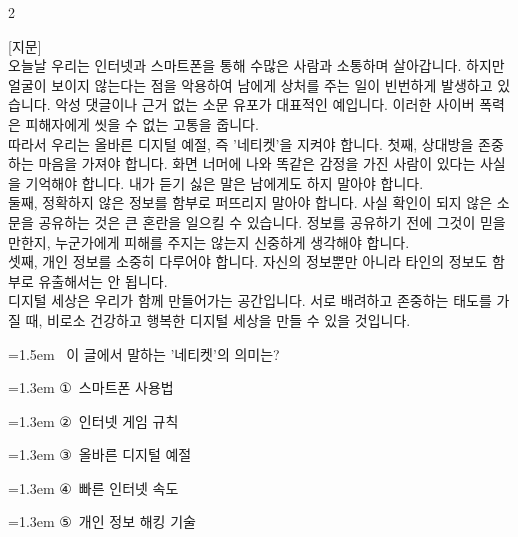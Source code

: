 \documentclass[11pt, a4paper]{article}
\begin{document}
\begin{multicols}{2}
\begin{passagebox}
\noindent{}[지문] \\
오늘날 우리는 인터넷과 스마트폰을 통해 수많은 사람과 소통하며 살아갑니다. 하지만 얼굴이 보이지 않는다는 점을 악용하여 남에게 상처를 주는 일이 빈번하게 발생하고 있습니다. 악성 댓글이나 근거 없는 소문 유포가 대표적인 예입니다. 이러한 사이버 폭력은 피해자에게 씻을 수 없는 고통을 줍니다. \\
따라서 우리는 올바른 디지털 예절, 즉 '네티켓'을 지켜야 합니다. 첫째, 상대방을 존중하는 마음을 가져야 합니다. 화면 너머에 나와 똑같은 감정을 가진 사람이 있다는 사실을 기억해야 합니다. 내가 듣기 싫은 말은 남에게도 하지 말아야 합니다. \\
둘째, 정확하지 않은 정보를 함부로 퍼뜨리지 말아야 합니다. 사실 확인이 되지 않은 소문을 공유하는 것은 큰 혼란을 일으킬 수 있습니다. 정보를 공유하기 전에 그것이 믿을 만한지, 누군가에게 피해를 주지는 않는지 신중하게 생각해야 합니다. \\
셋째, 개인 정보를 소중히 다루어야 합니다. 자신의 정보뿐만 아니라 타인의 정보도 함부로 유출해서는 안 됩니다. \\
디지털 세상은 우리가 함께 만들어가는 공간입니다. 서로 배려하고 존중하는 태도를 가질 때, 비로소 건강하고 행복한 디지털 세상을 만들 수 있을 것입니다.
\end{passagebox}
\vspace{1mm}

\noindent\begin{minipage}{\columnwidth}
\vspace{2mm}
{\hangindent=1.5em  ~이 글에서 말하는 '네티켓'의 의미는?\par}

\vspace{0.5mm}
{\hangindent=1.3em  \noindent\hspace{0.3em}①~스마트폰 사용법\par}
{\hangindent=1.3em  \noindent\hspace{0.3em}②~인터넷 게임 규칙\par}
{\hangindent=1.3em  \noindent\hspace{0.3em}③~올바른 디지털 예절\par}
{\hangindent=1.3em  \noindent\hspace{0.3em}④~빠른 인터넷 속도\par}
{\hangindent=1.3em  \noindent\hspace{0.3em}⑤~개인 정보 해킹 기술\par}
\vspace{4mm}
\end{minipage}
\par


\end{multicols}
\end{document}
